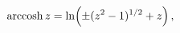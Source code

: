 \[\mathop{\mathrm{arccosh}\/}\nolimits z=\mathop{\ln\/}\nolimits\!\left(\pm(z^{2%
}-1)^{1/2}+z\right),\]
